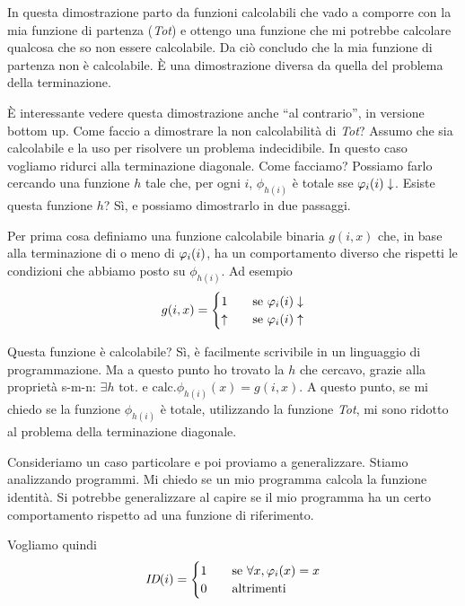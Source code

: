 In questa dimostrazione parto da funzioni calcolabili che vado a comporre con la mia funzione di
partenza (\textit{Tot}) e ottengo una funzione che mi potrebbe calcolare qualcosa che so non essere
calcolabile. Da ciò concludo che la mia funzione di partenza non è calcolabile. È una
dimostrazione diversa da quella del problema della terminazione.

È interessante vedere questa dimostrazione anche ``al contrario'', in versione bottom up. Come
faccio a dimostrare la non calcolabilità di \textit{Tot}? Assumo che sia calcolabile e la uso per
risolvere un problema indecidibile. In questo caso vogliamo ridurci alla terminazione diagonale.
Come facciamo? Possiamo farlo cercando una funzione $h$ tale che, per ogni $i$, $\phi_{h(i)}$ è totale sse
$\varphi_{i}(i) \downarrow$. Esiste questa funzione $h$? Sì, e possiamo dimostrarlo in due passaggi.

Per prima cosa definiamo una funzione calcolabile binaria $g(i,x)$ che, in base alla terminazione di
o meno di $\varphi_{i}(i)$, ha un comportamento diverso che rispetti le condizioni che abbiamo posto su
$\phi_{h(i)}$. Ad esempio
\begin{equation*}
    g(i,x) =
    \begin{cases}
        1 \quad &\text{se $\varphi_{i}(i)\downarrow$} \\
        \uparrow \quad &\text{se $\varphi_{i}(i)\uparrow$} \\
    \end{cases}
\end{equation*}

Questa funzione è calcolabile? Sì, è facilmente scrivibile in un linguaggio di programmazione. Ma a
questo punto ho trovato la $h$ che cercavo, grazie alla proprietà s-m-n: $\exists h \text{ tot. e
calc.} \phi_{h(i)}(x) = g(i,x)$. A questo punto, se mi chiedo se la funzione $\phi_{h(i)}$ è totale,
utilizzando la funzione \textit{Tot}, mi sono ridotto al problema della terminazione diagonale.

Consideriamo un caso particolare e poi proviamo a generalizzare. Stiamo analizzando programmi. Mi
chiedo se un mio programma calcola la funzione identità. Si potrebbe generalizzare al capire se il
mio programma ha un certo comportamento rispetto ad una funzione di riferimento.

Vogliamo quindi
\begin{equation*}
    \textit{ID}(i) =
    \begin{cases}
        1 \quad &\text{se $\forall x, \varphi_{i}(x) = x$} \\
        0 \quad &\text{altrimenti}
    \end{cases}
\end{equation*}

